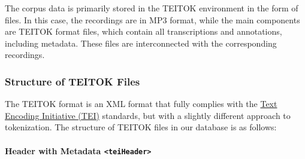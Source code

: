 \documentclass[
]{article}
\begin{document}
The corpus data is primarily stored in the TEITOK environment in the
form of files. In this case, the recordings are in MP3 format, while the
main components are TEITOK format files, which contain all
transcriptions and annotations, including metadata. These files are
interconnected with the corresponding recordings.

\hypertarget{structure-of-teitok-files}{%
\subsubsection{Structure of TEITOK
Files}\label{structure-of-teitok-files}}

The TEITOK format is an XML format that fully complies with the
\href{https://www.tei-c.org/}{Text Encoding Initiative (TEI)} standards,
but with a slightly different approach to tokenization. The structure of
TEITOK files in our database is as follows:

\hypertarget{header-with-metadata-teiheader}{%
\paragraph{\texorpdfstring{Header with Metadata
\texttt{\textless{}teiHeader\textgreater{}}}{Header with Metadata \textless teiHeader\textgreater{}}}\label{header-with-metadata-teiheader}}
\end{document}
